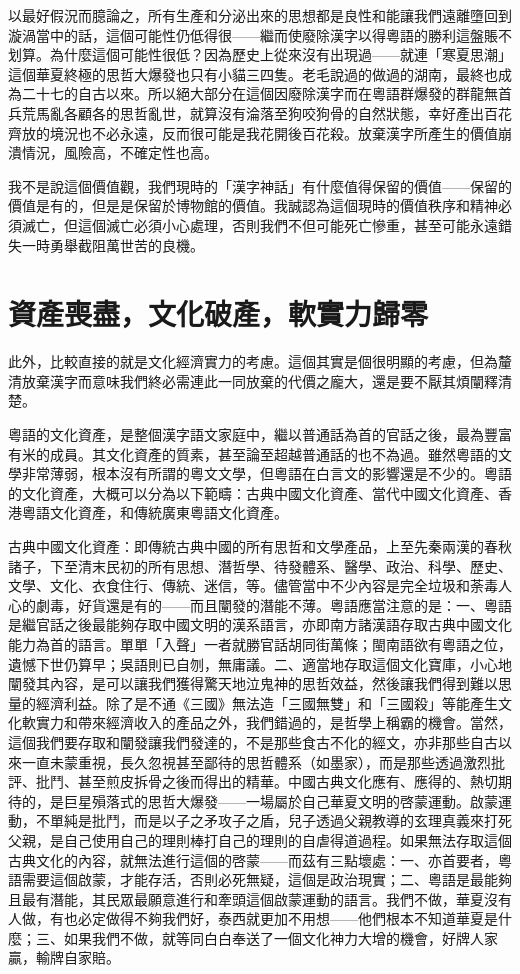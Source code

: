 \documentclass[a5paper, 12pt, openany]{book} %
\begin{document}
以最好假況而臆論之，所有生產和分泌出來的思想都是良性和能讓我們遠離墮回到漩渦當中的話，這個可能性仍低得很——繼而使廢除漢字以得粵語的勝利這盤賬不划算。為什麼這個可能性很低？因為歷史上從來沒有出現過——就連「寒夏思潮」這個華夏終極的思哲大爆發也只有小貓三四隻。老毛說過的做過的湖南，最終也成為二十七的自古以來。所以絕大部分在這個因廢除漢字而在粵語群爆發的群龍無首兵荒馬亂各顧各的思哲亂世，就算沒有淪落至狗咬狗骨的自然狀態，幸好產出百花齊放的境況也不必永遠，反而很可能是我花開後百花殺。放棄漢字所產生的價值崩潰情況，風險高，不確定性也高。

我不是說這個價值觀，我們現時的「漢字神話」有什麼值得保留的價值——保留的價值是有的，但是是保留於博物館的價值。我誠認為這個現時的價值秩序和精神必須滅亡，但這個滅亡必須小心處理，否則我們不但可能死亡慘重，甚至可能永遠錯失一時勇舉截阻萬世苦的良機。 

\section{資產喪盡，文化破產，軟實力歸零}

此外，比較直接的就是文化經濟實力的考慮。這個其實是個很明顯的考慮，但為釐清放棄漢字而意味我們終必需連此一同放棄的代價之龐大，還是要不厭其煩闡釋清楚。

粵語的文化資產，是整個漢字語文家庭中，繼以普通話為首的官話之後，最為豐富有米的成員。其文化資產的質素，甚至論至超越普通話的也不為過。雖然粵語的文學非常薄弱，根本沒有所謂的粵文文學，但粵語在白言文的影響還是不少的。粵語的文化資產，大概可以分為以下範疇：古典中國文化資產、當代中國文化資產、香港粵語文化資產，和傳統廣東粵語文化資產。

古典中國文化資產：即傳統古典中國的所有思哲和文學產品，上至先秦兩漢的春秋諸子，下至清末民初的所有思想、潛哲學、待發體系、醫學、政治、科學、歷史、文學、文化、衣食住行、傳統、迷信，等。儘管當中不少內容是完全垃圾和荼毒人心的劇毒，好貨還是有的——而且闡發的潛能不薄。粵語應當注意的是：一、粵語是繼官話之後最能夠存取中國文明的漢系語言，亦即南方諸漢語存取古典中國文化能力為首的語言。單單「入聲」一者就勝官話胡同街萬條；閩南語欲有粵語之位，遺憾下世仍算早；吳語則已自刎，無庸議。二、適當地存取這個文化寶庫，小心地闡發其內容，是可以讓我們獲得驚天地泣鬼神的思哲效益，然後讓我們得到難以思量的經濟利益。除了是不通《三國》無法造「三國無雙」和「三國殺」等能產生文化軟實力和帶來經濟收入的產品之外，我們錯過的，是哲學上稱霸的機會。當然，這個我們要存取和闡發讓我們發達的，不是那些食古不化的經文，亦非那些自古以來一直未蒙重視，長久忽視甚至鄙待的思哲體系（如墨家），而是那些透過激烈批評、批鬥、甚至煎皮拆骨之後而得出的精華。中國古典文化應有、應得的、熱切期待的，是巨星殞落式的思哲大爆發——一場屬於自己華夏文明的啓蒙運動。啟蒙運動，不單純是批鬥，而是以子之矛攻子之盾，兒子透過父親教導的玄理真義來打死父親，是自己使用自己的理則棒打自己的理則的自虐得道過程。如果無法存取這個古典文化的內容，就無法進行這個的啓蒙——而茲有三點壞處：一、亦首要者，粵語需要這個啟蒙，才能存活，否則必死無疑，這個是政治現實；二、粵語是最能夠且最有潛能，其民眾最願意進行和牽頭這個啟蒙運動的語言。我們不做，華夏沒有人做，有也必定做得不夠我們好，泰西就更加不用想——他們根本不知道華夏是什麼；三、如果我們不做，就等同白白奉送了一個文化神力大增的機會，好牌人家贏，輸牌自家賠。
\end{document}
